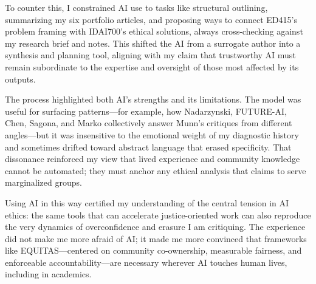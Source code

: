 \documentclass[12pt, letterpaper]{article}
\begin{document}
To counter this, I constrained AI use to tasks like structural outlining, summarizing my six portfolio articles, and proposing ways to connect ED415's problem framing with IDAI700's ethical solutions, always cross-checking against my research brief and notes. This shifted the AI from a surrogate author into a synthesis and planning tool, aligning with my claim that trustworthy AI must remain subordinate to the expertise and oversight of those most affected by its outputs.

The process highlighted both AI's strengths and its limitations. The model was useful for surfacing patterns—for example, how Nadarzynski, FUTURE-AI, Chen, Sagona, and Marko collectively answer Munn's critiques from different angles—but it was insensitive to the emotional weight of my diagnostic history and sometimes drifted toward abstract language that erased specificity. That dissonance reinforced my view that lived experience and community knowledge cannot be automated; they must anchor any ethical analysis that claims to serve marginalized groups.

Using AI in this way certified my understanding of the central tension in AI ethics: the same tools that can accelerate justice-oriented work can also reproduce the very dynamics of overconfidence and erasure I am critiquing. The experience did not make me more afraid of AI; it made me more convinced that frameworks like EQUITAS—centered on community co-ownership, measurable fairness, and enforceable accountability—are necessary wherever AI touches human lives, including in academics.
\end{document}
